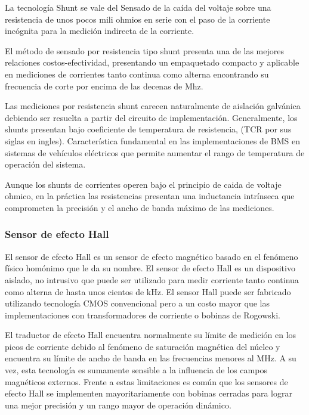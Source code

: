 \documentclass[10pt,a4paper]{article}
\begin{document}
	La tecnología Shunt se vale del Sensado de la caída del voltaje sobre una resistencia de unos pocos mili ohmios en serie con el paso de la corriente incógnita para la medición indirecta de la corriente.
	
	El método de sensado por resistencia tipo shunt presenta una de las mejores relaciones costos-efectividad, presentando un empaquetado compacto y aplicable en mediciones de corrientes tanto continua como alterna encontrando su frecuencia de corte por encima de las decenas de Mhz.
	
	Las mediciones por resistencia shunt carecen naturalmente de aislación galvánica debiendo ser resuelta a partir del circuito de implementación. Generalmente, los shunts presentan bajo coeficiente de temperatura de resistencia, (\acrfull{TCR} por sus siglas en ingles). Característica fundamental en las implementaciones de \acrshort{BMS} en sistemas de vehículos eléctricos que permite aumentar el rango de temperatura de operación del sistema.
	
	Aunque los shunts de corrientes operen bajo el principio de caida de voltaje ohmico, en la práctica las resistencias presentan una inductancia intrínseca que comprometen la precisión y el ancho de banda máximo de las mediciones.
	
	\subsubsection{Sensor de efecto Hall}

	El sensor de efecto Hall es un sensor de efecto magnético basado en el fenómeno físico homónimo que le da su nombre. 
	El sensor de efecto Hall es un dispositivo aislado, no intrusivo que puede ser utilizado para medir corriente tanto continua como alterna de hasta unos cientos de kHz. El sensor Hall puede ser fabricado utilizando tecnología CMOS convencional pero a un costo mayor que las implementaciones con transformadores de corriente o bobinas de Rogowski.
	
	El traductor de efecto Hall encuentra normalmente su límite de medición en los picos de corriente debido al fenómeno de saturación magnética del núcleo y encuentra su límite de ancho de banda en las frecuencias menores al MHz. A su vez, esta tecnología es sumamente sensible a la influencia de los campos magnéticos externos. Frente a estas limitaciones es común que los sensores de efecto Hall se implementen mayoritariamente con bobinas cerradas para lograr una mejor precisión y un rango mayor de operación dinámico.
	
\end{document}
